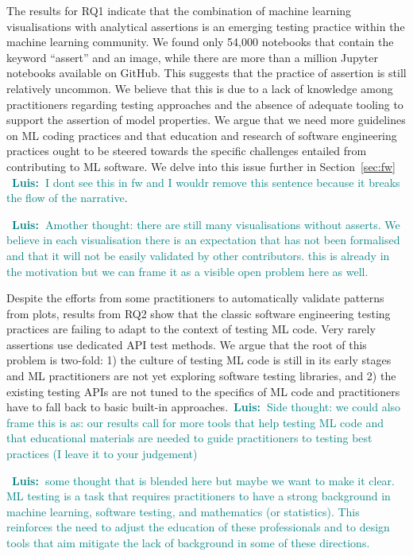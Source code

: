 \documentclass[conference]{IEEEtran}
\newcommand{\luis}[1]{\textcolor{teal}{\ding{46}~\textbf{Luis:~}#1}}
\begin{document}
The results for RQ1 indicate that the combination of machine learning visualisations with analytical assertions is an emerging testing practice within the machine learning community. We found only 54,000 notebooks that contain the keyword ``assert'' and an image, while there are more than a million Jupyter notebooks available on GitHub. This suggests that the practice of assertion is still relatively uncommon.
We believe that this is due to a lack of knowledge among practitioners regarding testing approaches and the absence of adequate tooling to support the assertion of model properties. We argue that we need more guidelines on ML coding practices and that education and research of software engineering practices ought to be steered towards the specific challenges entailed from contributing to ML software.  We delve into this issue further in Section~\ref{sec:fw} \luis{I dont see this in fw and I wouldr remove this sentence because it breaks the flow of the narrative}.

\luis{Amother thought: there are still many visualisations without asserts. We believe in each visualisation there is an expectation that has not been formalised and that it will not be easily validated by other contributors. this is already in the motivation but we can frame it as a visible open problem here as well.}

Despite the efforts from some practitioners to automatically validate patterns from plots, results from RQ2 show that the classic software engineering testing practices are failing to adapt to the context of testing ML code. Very rarely assertions use dedicated API test methods. We argue that the root of this problem is two-fold: 1) the culture of testing ML code is still in its early stages and ML practitioners are not yet exploring software testing libraries, and 2) the existing testing APIs are not tuned to the specifics of ML code and practitioners have to fall back to basic built-in approaches.\luis{Side thought: we could also frame this is as: our results call for more tools that help testing ML code and that educational materials are needed to guide practitioners to testing best practices (I leave it to your judgement)}

\luis{some thought that is blended here but maybe we want to make it clear. ML testing is a task that requires practitioners to have a strong background in machine learning, software testing, and mathematics (or statistics). This reinforces the need to adjust the education of these professionals and to design tools that aim mitigate the lack of background in some of these directions.}
\end{document}
